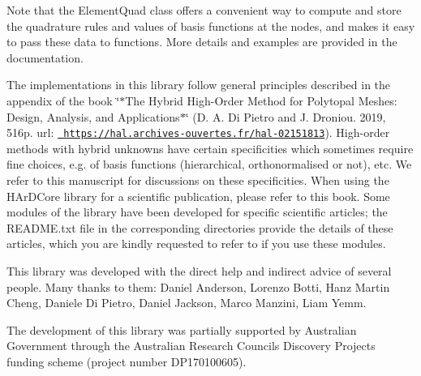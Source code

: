 \begin{DoxyCode}{0}
\end{DoxyCode}


Note that the {\ttfamily Element\+Quad} class offers a convenient way to compute and store the quadrature rules and values of basis functions at the nodes, and makes it easy to pass these data to functions. More details and examples are provided in the documentation.

The implementations in this library follow general principles described in the appendix of the book \char`\"{}$\ast$\+The Hybrid High-\/\+Order Method for Polytopal Meshes\+: Design, Analysis, and Applications$\ast$\char`\"{} (D. A. Di Pietro and J. Droniou. 2019, 516p. url\+: \href{https://hal.archives-ouvertes.fr/hal-02151813}{\texttt{ https\+://hal.\+archives-\/ouvertes.\+fr/hal-\/02151813}}). High-\/order methods with hybrid unknowns have certain specificities which sometimes require fine choices, e.\+g. of basis functions (hierarchical, orthonormalised or not), etc. We refer to this manuscript for discussions on these specificities. When using the H\+Ar\+D\+Core library for a scientific publication, please refer to this book. Some modules of the library have been developed for specific scientific articles; the R\+E\+A\+D\+M\+E.\+txt file in the corresponding directories provide the details of these articles, which you are kindly requested to refer to if you use these modules.

This library was developed with the direct help and indirect advice of several people. Many thanks to them\+: Daniel Anderson, Lorenzo Botti, Hanz Martin Cheng, Daniele Di Pietro, Daniel Jackson, Marco Manzini, Liam Yemm.

The development of this library was partially supported by Australian Government through the Australian Research Council\textquotesingle{}s Discovery Projects funding scheme (project number D\+P170100605). 